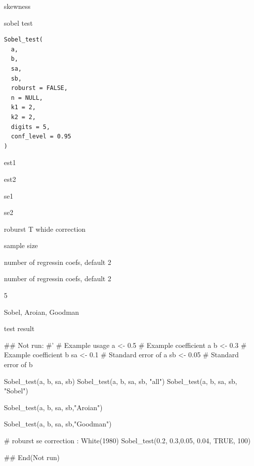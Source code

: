 \documentclass[a4paper]{book}
\begin{document}
%
\begin{Value}
skewness
\end{Value}
%
\begin{Description}
sobel test
\end{Description}
%
\begin{Usage}
\begin{verbatim}
Sobel_test(
  a,
  b,
  sa,
  sb,
  roburst = FALSE,
  n = NULL,
  k1 = 2,
  k2 = 2,
  digits = 5,
  conf_level = 0.95
)
\end{verbatim}
\end{Usage}
%
\begin{Arguments}
\begin{ldescription}
\item[\code{a}] est1

\item[\code{b}] est2

\item[\code{sa}] se1

\item[\code{sb}] se2

\item[\code{roburst}] roburst T whide correction

\item[\code{n}] sample size

\item[\code{k1}] number of regressin coefs, default 2

\item[\code{k2}] number of regressin coefs, default 2

\item[\code{digits}] 5

\item[\code{type}] Sobel, Aroian, Goodman
\end{ldescription}
\end{Arguments}
%
\begin{Value}
test result
\end{Value}
%
\begin{Examples}
\begin{ExampleCode}

## Not run: 
#'
# Example usage
a <- 0.5  # Example coefficient a
b <- 0.3  # Example coefficient b
sa <- 0.1 # Standard error of a
sb <- 0.05 # Standard error of b

Sobel_test(a, b, sa, sb)
Sobel_test(a, b, sa, sb, "all")
Sobel_test(a, b, sa, sb, "Sobel")

Sobel_test(a, b, sa, sb,"Aroian")

Sobel_test(a, b, sa, sb,"Goodman")


# roburst se correction : White(1980)
Sobel_test(0.2, 0.3,0.05, 0.04, TRUE, 100)


## End(Not run)

\end{ExampleCode}
\end{Examples}
\end{document}

